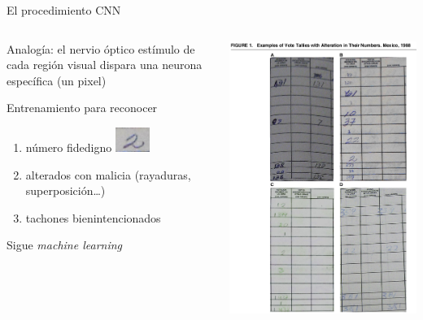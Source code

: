 \documentclass[bigger]{beamer}
\begin{document}
\begin{frame}[label={sec:org3fd5708}]{El procedimiento CNN}
\begin{columns}
\begin{column}{0.55\columnwidth}
Analogía: el nervio óptico \newline estímulo de cada región visual dispara una neurona específica (un pixel)

\bigskip Entrenamiento para reconocer
\begin{enumerate}
\item número fidedigno \includegraphics[width=.1\textwidth]{./pics/dos.png} \\
\item alterados con malicia (rayaduras, superposición\ldots{})
\item tachones bienintencionados
\end{enumerate}

\bigskip Sigue \emph{machine learning}
\end{column}
\begin{column}{0.45\columnwidth}
\includegraphics[width=\columnwidth]{./pics/fig1-apsr.png}
\end{column}
\end{columns}
\end{frame}
\end{document}
